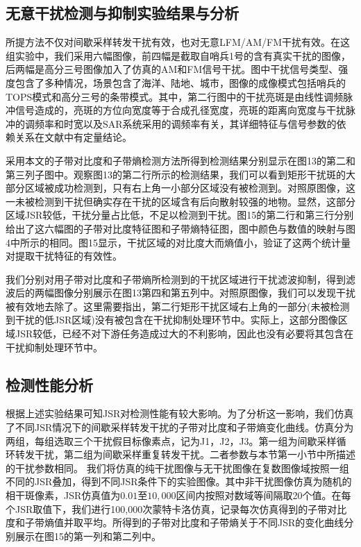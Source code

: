\documentclass[10.5pt,UTF8]{JR}
\theoremstyle{mystyle}
\begin{document}
\subsection{无意干扰检测与抑制实验结果与分析}

所提方法不仅对间歇采样转发干扰有效，也对无意LFM/AM/FM干扰有效。在这组实验中，我们采用六幅图像，前四幅是截取自哨兵1号的含有真实干扰的图像，后两幅是高分三号图像加入了仿真的AM和FM信号干扰。图中干扰信号类型、强度包含了多种情况，场景包含了海洋、陆地、城市，图像的成像模式包括哨兵的TOPS模式和高分三号的条带模式。其中，第二行图中的干扰亮斑是由线性调频脉冲信号造成的，亮斑的方位向宽度等于合成孔径宽度，亮斑的距离向宽度与干扰脉冲的调频率和时宽以及SAR系统采用的调频率有关，其详细特征与信号参数的依赖关系在文献\cite{yang2020mutual}中有定量结论。

采用本文的子带对比度和子带熵检测方法所得到检测结果分别显示在图13的第二和第三列子图中。观察图13的第二行所示的检测结果，我们可以看到矩形干扰斑的大部分区域被成功检测到，只有右上角一小部分区域没有被检测到。对照原图像，这一未被检测到干扰但确实存在干扰的区域含有后向散射较强的地物。显然，这部分区域JSR较低，干扰分量占比低，不足以检测到干扰。图15的第二行和第三行分别给出了这六幅图的子带对比度特征图和子带熵特征图，图中颜色与数值的映射与图4中所示的相同。图15显示，干扰区域的对比度大而熵值小，验证了这两个统计量对提取干扰特征的有效性。

我们分别对用子带对比度和子带熵所检测到的干扰区域进行干扰滤波抑制，得到滤波后的两幅图像分别展示在图13第四和第五列中。对照原图像，我们可以发现干扰被有效地去除了。这里需要指出，第二行矩形干扰区域右上角的一部分(未被检测到干扰的低JSR区域)没有被包含在干扰抑制处理环节中。实际上，这部分图像区域JSR较低，已经不对下游任务造成过大的不利影响，因此也没有必要将其包含在干扰抑制处理环节中。


\subsection{检测性能分析}

根据上述实验结果可知JSR对检测性能有较大影响。为了分析这一影响，我们仿真了不同JSR情况下的间歇采样转发干扰的子带对比度和子带熵变化曲线。仿真分为两组，每组选取三个干扰假目标像素点，记为J1，J2，J3。第一组为间歇采样循环转发干扰，第二组为间歇采样重复转发干扰。二者参数与本节第一小节中所描述的干扰参数相同。
我们将仿真的纯干扰图像与无干扰图像在复数图像域按照一组不同的JSR叠加，得到不同JSR条件下的实验图像。其中非干扰图像仿真为随机的相干斑像素，JSR仿真值为$0.01$至$10,000$区间内按照对数域等间隔取20个值。在每个JSR取值下，我们进行100,000次蒙特卡洛仿真，记录每次仿真得到的子带对比度和子带熵值并取平均。所得到的子带对比度和子带熵关于不同JSR的变化曲线分别展示在图15的第一列和第二列中。
\end{document}
